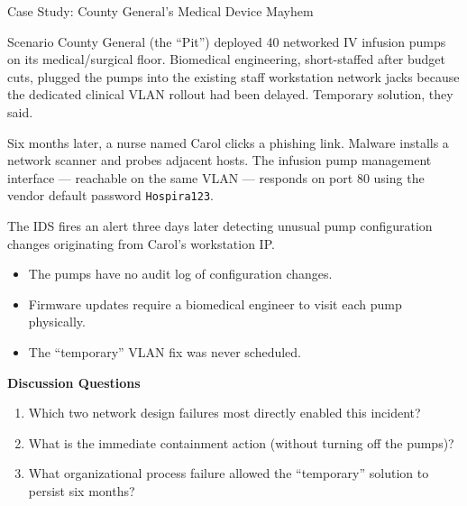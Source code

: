 \documentclass[aspectratio=169]{beamer}  %
\begin{document}
\begin{frame}{Case Study: County General's Medical Device Mayhem}
    \begin{block}{Scenario}
        \scriptsize
        County General (the ``Pit'') deployed 40 networked IV infusion pumps on its medical/surgical floor. Biomedical engineering, short-staffed after budget cuts, plugged the pumps into the existing staff workstation network jacks because the dedicated clinical VLAN rollout had been delayed. Temporary solution, they said.

        Six months later, a nurse named Carol clicks a phishing link. Malware installs a network scanner and probes adjacent hosts. The infusion pump management interface --- reachable on the same VLAN --- responds on port 80 using the vendor default password \texttt{Hospira123}.

        The IDS fires an alert three days later detecting unusual pump configuration changes originating from Carol's workstation IP.

        \begin{itemize}\setlength{\itemsep}{1pt}
            \item The pumps have no audit log of configuration changes.
            \item Firmware updates require a biomedical engineer to visit each pump physically.
            \item The ``temporary'' VLAN fix was never scheduled.
        \end{itemize}
    \end{block}
    \scriptsize
    \textbf{Discussion Questions}
    \begin{enumerate}\setlength{\itemsep}{1pt}
        \item Which two network design failures most directly enabled this incident?
        \item What is the immediate containment action (without turning off the pumps)?
        \item What organizational process failure allowed the ``temporary'' solution to persist six months?
    \end{enumerate}
\end{frame}
\end{document}
